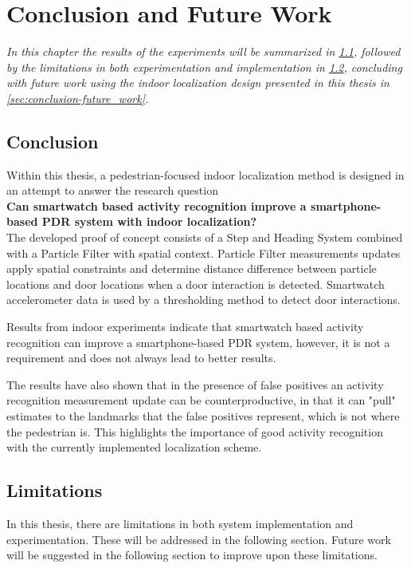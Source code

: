 \chapter{Conclusion and Future Work}
\textit{In this chapter the results of the experiments will be summarized in \cref{sec:conclusion-conclusion}, followed by the limitations in both experimentation and implementation in \cref{sec:conclusion-limitations}, concluding with future work using the indoor localization design presented in this thesis in \cref{sec:conclusion-future_work}.}


\section{Conclusion}
\label{sec:conclusion-conclusion}
Within this thesis, a pedestrian-focused indoor localization method is designed in an attempt to answer the research question \\

\textbf{Can smartwatch based activity recognition improve a smartphone-based \ac{PDR} system with indoor localization?} \\

The developed proof of concept consists of a Step and Heading System combined with a Particle Filter with spatial context. Particle Filter measurements updates apply spatial constraints and determine distance difference between particle locations and door locations when a door interaction is detected. Smartwatch accelerometer data is used by a thresholding method to detect door interactions. \par

Results from indoor experiments indicate that smartwatch based activity recognition can improve a smartphone-based \ac{PDR} system, however, it is not a requirement and does not always lead to better results. \par 

The results have also shown that in the presence of false positives an activity recognition measurement update can be counterproductive, in that it can "pull" estimates to the landmarks that the false positives represent, which is not where the pedestrian is. This highlights the importance of good activity recognition with the currently implemented localization scheme.

\section{Limitations}
\label{sec:conclusion-limitations}
In this thesis, there are limitations in both system implementation and experimentation. These will be addressed in the following section. Future work will be suggested in the following section to improve upon these limitations.

